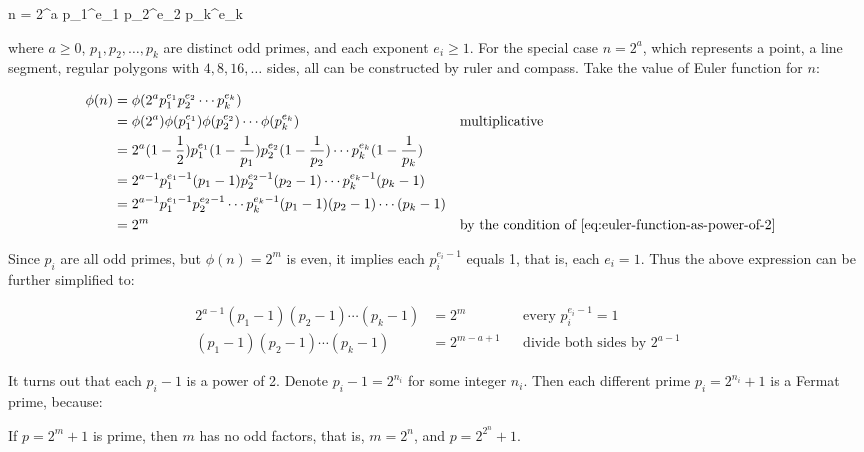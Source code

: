 \be
n = 2^a p_1^{e_1} p_2^{e_2} \dotsm p_k^{e_k}
\ee

where $a \ge 0$, $p_1, p_2, \dotsc, p_k$ are distinct odd primes, and each exponent $e_i \ge 1$. For the special case $n = 2^a$, which represents a point, a line segment, regular polygons with $4, 8, 16, \dotsc$ sides, all can be constructed by ruler and compass. Take the value of Euler function for $n$:

\begin{align*}
\phi(n) &= \phi(2^a p_1^{e_1} p_2^{e_2} \dotsm p_k^{e_k})  \\
        &= \phi(2^a) \phi(p_1^{e_1}) \phi(p_2^{e_2}) \dotsm \phi(p_k^{e_k}) && \text{multiplicative} \\
        &= 2^a(1 - \frac{1}{2}) p_1^{e_1}(1 - \frac{1}{p_1}) p_2^{e_2}(1 - \frac{1}{p_2})\dotsm p_k^{e_k}(1 - \frac{1}{p_k}) \\
        &= 2^{a-1} p_1^{e_1 - 1}(p_1 - 1) p_2^{e_2 - 1}(p_2 - 1)\dotsm p_k^{e_k - 1}(p_k - 1) \\
        &= 2^{a-1} p_1^{e_1 - 1} p_2^{e_2 - 1} \dotsm p_k^{e_k - 1} (p_1 - 1)(p_2 - 1) \dotsm (p_k - 1) \\
        &= 2^m &&\text{by the condition of \cref{eq:euler-function-as-power-of-2}}
\end{align*}

Since $p_i$ are all odd primes, but $\phi(n) = 2^m$ is even, it implies each $p_i^{e_i - 1}$ equals 1, that is, each $e_i = 1$. Thus the above expression can be further simplified to:

\begin{align*}
2^{a-1} (p_1 - 1)(p_2 - 1) \dotsm (p_k - 1) & = 2^m  && \text{every }p_i^{e_i - 1} = 1 \\
(p_1 - 1)(p_2 - 1) \dotsm (p_k - 1) &= 2^{m - a + 1} && \text{divide both sides by }2^{a-1}
\end{align*}

It turns out that each $p_i - 1$ is a power of 2. Denote $p_i - 1 = 2^{n_i}$ for some integer $n_i$. Then each different prime $p_i = 2^{n_i} + 1$ is a Fermat prime, because:

\begin{proposition}
If $p = 2^m + 1$ is prime, then $m$ has no odd factors, that is, $m = 2^n$, and $p = 2^{2^n} + 1$.
\end{proposition}

